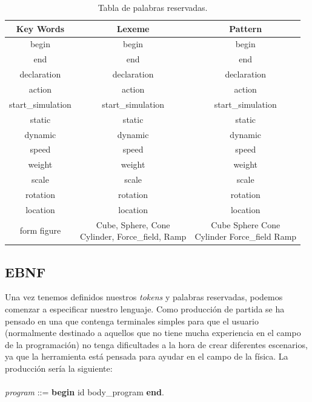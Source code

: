 \documentclass[12pt]{article}
\begin{document}
\begin{table}[h]
\centering
\begin{tabular}{| c | c | c |} \hline
\textbf{Key Words}          & \textbf{Lexeme} 													&  \textbf{Pattern} 		\\\hline
begin            			& begin     														& begin        				\\\hline
end             			& end      															& end        			    \\\hline
declaration           		& declaration       												& declaration        		\\\hline
action           			& action       														& action       			  	\\\hline
start\_simulation 			& start\_simulation       											& start\_simulation        	\\\hline
static						& static 															& static 					\\\hline
dynamic 					& dynamic 															& dynamic 					\\\hline
speed 						& speed 															& speed 					\\\hline
weight 						& weight 															& weight 					\\\hline
scale 						& scale 															& scale 					\\\hline
rotation					& rotation 															& rotation					\\\hline
location 					& location 															& location					\\\hline
form figure       			& \makecell{Cube, Sphere, Cone \\ Cylinder, Force\_field, Ramp}     & \makecell{Cube \textbar Sphere \textbar Cone \\ Cylinder \textbar Force\_field \textbar Ramp}        														  \\\hline
\end{tabular}
\caption{\label{tab:KeyWords}Tabla de palabras reservadas.}
\end{table}

\subsection{EBNF}

Una vez tenemos definidos nuestros \textit{tokens} y palabras reservadas, podemos comenzar a especificar nuestro lenguaje. Como producción de partida se ha pensado en una que contenga terminales simples para que el usuario (normalmente destinado a aquellos que no tiene mucha experiencia en el campo de la programación) no tenga dificultades a la hora de crear diferentes escenarios, ya que la herramienta está pensada para ayudar en el campo de la física. La producción sería la siguiente: \\ \\
\noindent \textit{program} ::= \textbf{begin} id body\_program \textbf{end}.
\end{document}
